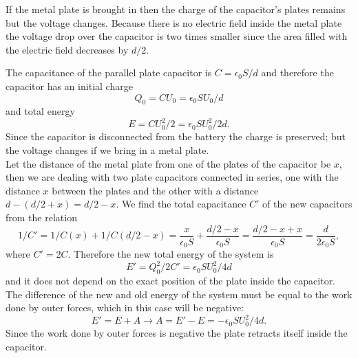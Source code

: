 {\ifEngHint
If the metal plate is brought in then the charge of the capacitor's plates remains but the voltage changes. Because there is no electric field inside the metal plate the voltage drop over the capacitor is two times smaller since the area filled with the electric field decreases by $d/2$.
\fi


\ifEngSolution
The capacitance of the parallel plate capacitor is $C = \epsilon_0 S / d$ and therefore the capacitor has an initial charge
$$Q_0 = C U_0 = \epsilon_0 S U_0/ d$$ 
and total energy 
$$E = C U_0^2 / 2 = \epsilon_0 S U_0^2/ 2 d.$$ 
Since the capacitor is disconnected from the battery the charge is preserved; but the voltage changes if we bring in a metal plate.\\
Let the distance of the metal plate from one of the plates of the capacitor be $x$, then we are dealing with two plate capacitors connected in series, one with the distance $x$ between the plates and the other with a distance $d - (d/2 + x) = d/2 - x$. We find the total capacitance $C'$ of the new capacitors from the relation
$$1/C' = 1/C(x) + 1/C(d/2-x) = \frac{x}{\epsilon_0 S} + \frac{d/2 - x}{\epsilon_0 S} = \frac{d/2 - x + x}{\epsilon_0 S} = \frac{d}{2 \epsilon_0 S},$$ 
where $C' = 2C$. Therefore the new total energy of the system is
$$E' = Q_0^2 / 2C' = \epsilon_0 S U_0^2/ 4 d$$
and it does not depend on the exact position of the plate inside the capacitor. The difference of the new and old energy of the system must be equal to the work done by outer forces, which in this case will be negative:
$$E' = E + A \rightarrow A = E' - E = - \epsilon_0 S U_0^2/ 4 d.$$ 
Since the work done by outer forces is negative the plate retracts itself inside the capacitor.
\fi
}